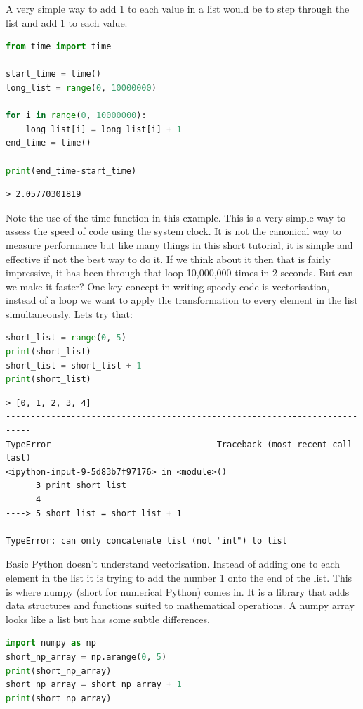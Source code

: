 	A very simple way to add 1 to each value in a list would be to step through the list and add 1 to each value.
	\begin{lstlisting}[language=Python]
from time import time

start_time = time()
long_list = range(0, 10000000)

for i in range(0, 10000000):
	long_list[i] = long_list[i] + 1
end_time = time()

print(end_time-start_time)\end{lstlisting}
	\begin{verbatim}> 2.05770301819\end{verbatim}

	Note the use of the time function in this example. This is a very simple way to assess the speed of code using the system clock. It is not the canonical way to measure performance but like many things in this short tutorial, it is simple and effective if not the best way to do it.
	If we think about it then that is fairly impressive, it has been through that loop 10,000,000 times in 2 seconds. But can we make it faster? One key concept in writing speedy code is vectorisation, instead of a loop we want to apply the transformation to every element in the list simultaneously. Lets try that:

	\begin{lstlisting}[language=Python]
short_list = range(0, 5)
print(short_list)
short_list = short_list + 1
print(short_list)\end{lstlisting}

	\begin{verbatim}
> [0, 1, 2, 3, 4]
---------------------------------------------------------------------------
TypeError                                 Traceback (most recent call last)
<ipython-input-9-5d83b7f97176> in <module>()
      3 print short_list
      4 
----> 5 short_list = short_list + 1

TypeError: can only concatenate list (not "int") to list\end{verbatim}

	Basic Python doesn't understand vectorisation. Instead of adding one to each element in the list it is trying to add the number 1 onto the end of the list. This is where numpy (short for numerical Python) comes in. It is a library that adds data structures and functions suited to mathematical operations. A numpy array looks like a list but has some subtle differences.

	\begin{lstlisting}[language=Python]
import numpy as np
short_np_array = np.arange(0, 5)
print(short_np_array)
short_np_array = short_np_array + 1
print(short_np_array)\end{lstlisting}

